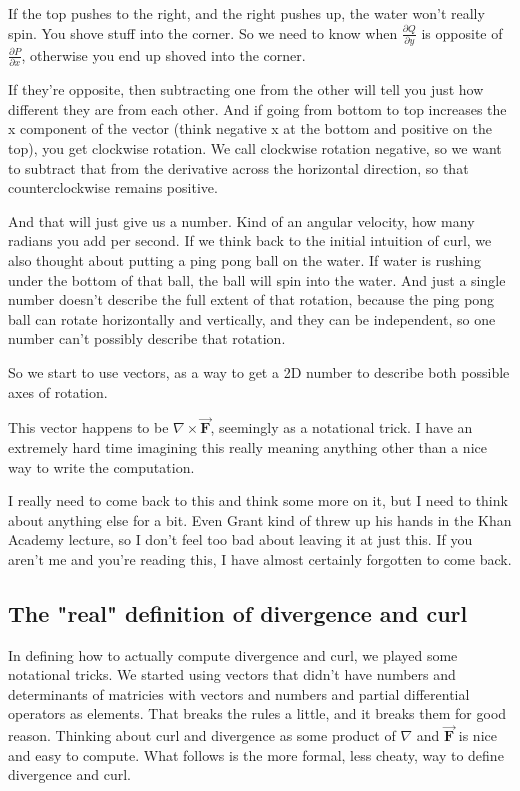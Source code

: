 \documentclass[12pt, letterpaper]{article}
\begin{document}
If the top pushes to the right, and the right pushes up, the water won't really spin.
You shove stuff into the corner.
So we need to know when $\frac{\partial Q}{\partial y}$ is opposite of $\frac{\partial P}{\partial x}$,
otherwise you end up shoved into the corner.

If they're opposite, then subtracting one from the other will tell you just how different they are from each other.
And if going from bottom to top increases the x component of the vector (think negative x at the bottom and positive on the top), you get clockwise rotation.
We call clockwise rotation negative, so we want to subtract that from the derivative across the horizontal direction, so that counterclockwise remains positive.

And that will just give us a number.
Kind of an angular velocity, how many radians you add per second.
If we think back to the initial intuition of curl, we also thought about putting a ping pong ball on the water.
If water is rushing under the bottom of that ball, the ball will spin into the water.
And just a single number doesn't describe the full extent of that rotation, because the ping pong ball can rotate horizontally and vertically,
and they can be independent, so one number can't possibly describe that rotation.

So we start to use vectors, as a way to get a 2D number to describe both possible axes of rotation.

This vector happens to be $\nabla \times \vec{\mathbf{F}}$, seemingly as a notational trick.
I have an extremely hard time imagining this really meaning anything other than a nice way to write the computation.

I really need to come back to this and think some more on it, but I need to think about anything else for a bit.
Even Grant kind of threw up his hands in the Khan Academy lecture, so I don't feel too bad about leaving it at just this.
If you aren't me and you're reading this, I have almost certainly forgotten to come back.

\subsection{The "real" definition of divergence and curl}
In defining how to actually compute divergence and curl, we played some notational tricks.
We started using vectors that didn't have numbers and determinants of matricies with vectors and numbers and partial differential operators as elements.
That breaks the rules a little, and it breaks them for good reason.
Thinking about curl and divergence as some product of $\nabla$ and $\vec{\mathbf{F}}$ is nice and easy to compute.
What follows is the more formal, less cheaty, way to define divergence and curl.
\end{document}

